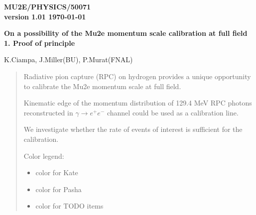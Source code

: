 \documentclass[12pt]{article}
\newcommand {\blue}      {\color{blue}}
\newcommand {\green}     {\color{ForestGreen}}
\newcommand {\red}       {\color{red}}
\newcommand {\pasha}[1]    {{\green  #1}}
\newcommand {\kate}[1]     {{\blue   #1}}
\begin{document}
\begin{titlepage}
  \begin{flushright}
    \bf {MU2E/PHYSICS/50071} \\
    version 1.01
    \today
 \end{flushright}

  \vspace{1cm}

  \begin{center}
    {\Large \bf On a possibility of the Mu2e momentum scale calibration at full field
      \vspace{0.3in}
      1. Proof of principle
    }

    \vspace{1cm}
    K.Ciampa, J.Miller(BU), P.Murat(FNAL)

    \vspace{0.3cm}

    \vspace{0.8cm}
  \end{center}

  \begin{abstract}
    \vspace{0.2in}
    Radiative pion capture (RPC) on hydrogen  provides a unique opportunity to calibrate
    the Mu2e momentum scale at full field.

    Kinematic edge of the momentum distribution of 129.4 MeV RPC photons
    reconstructed in $\gamma \to e^+e^-$ channel could be used as a calibration line.

    We investigate whether the rate of events of interest is sufficient for the calibration.

    Color legend:
    
    \begin{itemize}
    \item
      \kate{color for Kate}
    \item 
      \pasha{color for Pasha}
    \item
      {\red color for TODO items}
    \end{itemize}

      \end{abstract}

\end{titlepage}
%
%
%
{\tableofcontents}
\end{document}
